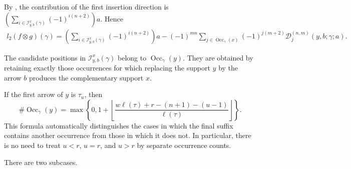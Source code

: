 \documentclass[11pt,a4paper,reqno]{amsart}
\newcommand{\mD}{\mathcal D}
\newcommand{\mI}{\mathcal I}
\newcommand{\Occ}{\operatorname{Occ}}
\theoremstyle{plain}
\theoremstyle{definition}
\numberwithin{equation}{section}
\begin{document}
	By , the contribution of the first
	insertion direction is
	$(\sum_{i\in\mI_{y,b}^{x}(\gamma)}(-1)^{i(n+2)})a$.
	Hence
	\begin{align}
		l_2(f\otimes g)(\gamma)
		=
		\left(
		\sum_{i\in\mI_{y,b}^{x}(\gamma)}
		(-1)^{i(n+2)}
		\right)a
		-
		(-1)^{mn}
		\sum_{j\in\Occ_\gamma(x)}
		(-1)^{j(m+2)}
		\mD_j^{(n,m)}(y,b;\gamma;a).
		\label{eq:suffix-arrow-read-off}
	\end{align}
	
	The candidate positions in $\mI_{y,b}^{x}(\gamma)$ belong to $\Occ_\gamma(y)$.  They are obtained by retaining exactly those
	occurrences for which replacing the support $y$ by the arrow $b$ produces
	the complementary support $x$.
	
	If the first arrow of $y$ is $\tau_u$, then
	\[
	\#\Occ_\gamma(y)
	=
	\max\left\{
	0,
	1+
	\left\lfloor
	\frac{
		w\ell(\tau)+r-(n+1)-(u-1)
	}{
		\ell(\tau)
	}
	\right\rfloor
	\right\}.
	\]
	This formula automatically distinguishes the cases in which the final suffix
	contains another occurrence from those in which it does not.  In particular,
	there is no need to treat $u<r$, $u=r$, and $u>r$ by separate
	occurrence counts.
	
	There are two subcases.
	
\end{document}
